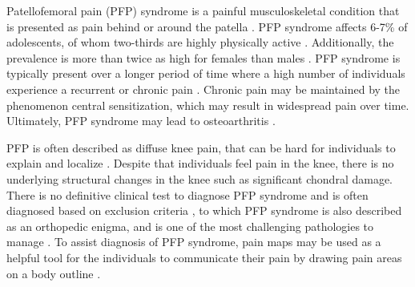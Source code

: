 Patellofemoral pain (PFP) syndrome is a painful musculoskeletal condition that is presented as pain behind or around the patella \citep{Maclachlan2017, Smith2015}. PFP syndrome affects 6-7\% of adolescents, of whom two-thirds are highly physically active \citep{Rathleff2015}. Additionally, the prevalence is more than twice as high for females than males \citep{Rathleff2015, Petersen2013}.
PFP syndrome is typically present over a longer period of time where a high number of individuals experience a recurrent or chronic pain \citep{Witvrouw2014}. Chronic pain may be maintained by the phenomenon central sensitization, which may result in widespread pain over time. Ultimately, PFP syndrome may lead to osteoarthritis \citep{Petersen2013, Crossley2016}. 

\noindent
PFP is often described as diffuse knee pain, that can be hard for individuals to explain and localize \citep{Witvrouw2014}. Despite that individuals feel pain in the knee, there is no underlying structural changes in the knee such as significant chondral damage. There is no definitive clinical test to diagnose PFP syndrome and is often diagnosed based on exclusion criteria \citep{Petersen2013}, to which PFP syndrome is also described as an orthopedic enigma, and is one of the most challenging pathologies to manage \citep{Dye2001}.
To assist diagnosis of PFP syndrome, pain maps may be used as a helpful tool for the individuals to communicate their pain by drawing pain areas on a body outline \citep{Boudreau2016}.


